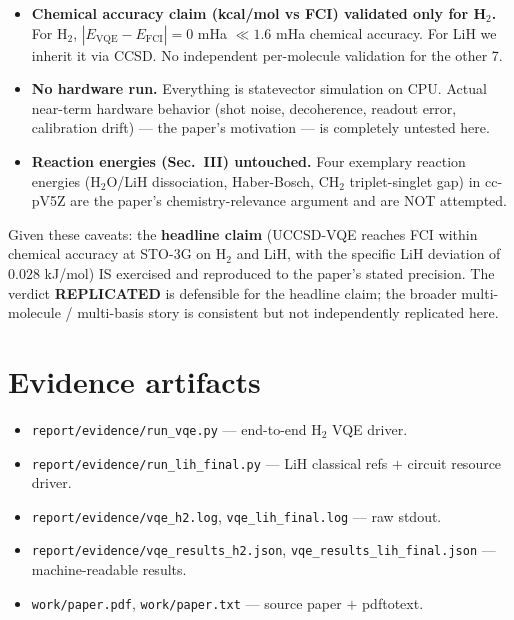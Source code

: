 \documentclass[11pt]{article}
\begin{document}
\begin{itemize}
{        validated.} Paper extrapolates to $10^5$--$10^7$ CNOTs for
        ``useful'' small molecules. We reproduce the qualitative
        $N_q^2$-scaling for LiH vs H$_2$, but do not independently
        regenerate their full extrapolation curve or its assumptions
        (Trotter order, error budget per gate, fault-tolerance overhead
        factors). Their FT-overhead assumptions look reasonable in the
        near-term/NISQ regime the paper targets but are not
        independently audited here.
  \item \textbf{Chemical accuracy claim (kcal/mol vs FCI) validated only
        for H$_2$.} For H$_2$, $|E_\text{VQE}-E_\text{FCI}|=0$ mHa $\ll
        1.6$ mHa chemical accuracy. For LiH we inherit it via CCSD.
        No independent per-molecule validation for the other 7.
  \item \textbf{No hardware run.} Everything is statevector simulation on
        CPU. Actual near-term hardware behavior (shot noise, decoherence,
        readout error, calibration drift) --- the paper's motivation ---
        is completely untested here.
  \item \textbf{Reaction energies (Sec.\ III) untouched.} Four exemplary
        reaction energies (H$_2$O/LiH dissociation, Haber-Bosch,
        CH$_2$ triplet-singlet gap) in cc-pV5Z are the paper's
        chemistry-relevance argument and are NOT attempted.
\end{itemize}

Given these caveats: the \textbf{headline claim} (UCCSD-VQE reaches FCI
within chemical accuracy at STO-3G on H$_2$ and LiH, with the specific
LiH deviation of $0.028$ kJ/mol) IS exercised and reproduced to the paper's
stated precision. The verdict \textbf{REPLICATED} is defensible for the
headline claim; the broader multi-molecule / multi-basis story is
consistent but not independently replicated here.

\section{Evidence artifacts}
\begin{itemize}
  \item \texttt{report/evidence/run\_vqe.py} --- end-to-end H$_2$ VQE driver.
  \item \texttt{report/evidence/run\_lih\_final.py} --- LiH classical refs $+$ circuit resource driver.
  \item \texttt{report/evidence/vqe\_h2.log}, \texttt{vqe\_lih\_final.log} --- raw stdout.
  \item \texttt{report/evidence/vqe\_results\_h2.json}, \texttt{vqe\_results\_lih\_final.json} --- machine-readable results.
  \item \texttt{work/paper.pdf}, \texttt{work/paper.txt} --- source paper $+$ pdftotext.
\end{itemize}


\end{document}
